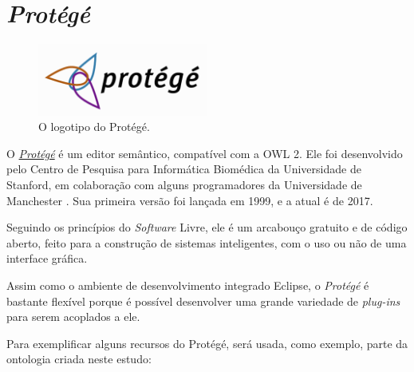\section{\textit{Protégé}}

\begin{figure}[H]
	\centering
	\includegraphics[width=0.5\textwidth]{Capitulos/Ferramentas/protege}
	\caption{O logotipo do Protégé.}
\end{figure}

O \href{https://protege.stanford.edu}{\textit{Protégé}} é um editor semântico, compatível com a OWL 2. Ele foi desenvolvido pelo Centro de Pesquisa para Informática Biomédica da Universidade de Stanford, em colaboração com alguns programadores da Universidade de Manchester \cite{ferramentasProtege}. Sua primeira versão foi lançada em 1999, e a atual é de 2017.

Seguindo os princípios do \textit{Software} Livre, ele é um arcabouço gratuito e de código aberto, feito para a construção de sistemas inteligentes, com o uso ou não de uma interface gráfica.

Assim como o ambiente de desenvolvimento integrado Eclipse, o \textit{Protégé} é bastante flexível porque é possível desenvolver uma grande variedade de \textit{plug-ins} para serem acoplados a ele.

Para exemplificar alguns recursos do Protégé, será usada, como exemplo, parte da ontologia criada neste estudo:

